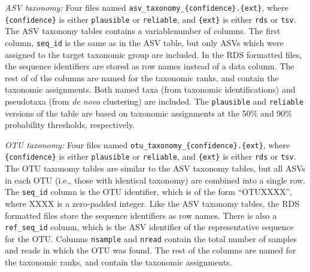 \documentclass[
]{article}
\begin{document}
\emph{ASV taxonomy:} Four files named \texttt{asv\_taxonomy\_\{confidence\}.\{ext\}}, where \texttt{\{confidence\}} is either \texttt{plausible} or \texttt{reliable}, and \texttt{\{ext\}} is either \texttt{rds} or \texttt{tsv}.
The ASV taxonomy tables contains a variablenumber of columns.
The first column, \texttt{seq\_id} is the same as in the ASV table, but only ASVs which were assigned to the target taxonomic group are included.
In the RDS formatted files, the sequence identifiers are stored as row names instead of a data column.
The rest of of the columns are named for the taxonomic ranks, and contain the taxonomic assignments.
Both named taxa (from taxonomic identifications) and pseudotaxa (from \emph{de novo} clustering) are included.
The \texttt{plausible} and \texttt{reliable} versions of the table are based on taxonomic assignments at the 50\% and 90\% probability thresholds, respectively.

\emph{OTU taxonomy:} Four files named \texttt{otu\_taxonomy\_\{confidence\}.\{ext\}}, where \texttt{\{confidence\}} is either \texttt{plausible} or \texttt{reliable}, and \texttt{\{ext\}} is either \texttt{rds} or \texttt{tsv}.
The OTU taxonomy tables are similar to the ASV taxonomy tables, but all ASVs in each OTU (i.e., those with identical taxonomy) are combined into a single row.
The \texttt{seq\_id} column is the OTU identifier, which is of the form ``OTUXXXX'', where XXXX is a zero-padded integer.
Like the ASV taxonomy tables, the RDS formatted files store the sequence identifiers as row names.
There is also a \texttt{ref\_seq\_id} column, which is the ASV identifier of the representative sequence for the OTU.
Columns \texttt{nsample} and \texttt{nread} contain the total number of samples and reads in which the OTU was found.
The rest of the columns are named for the taxonomic ranks, and contain the taxonomic assignments.
\end{document}
